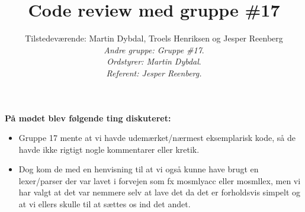 \documentclass[a4paper,10pt,draft]{article}
\begin{document}
\title{Code review med gruppe \#17}
\author{Tilstedeværende: Martin Dybdal, Troels Henriksen og Jesper Reenberg\\
\textit{Andre gruppe: Gruppe \#17}.\\
\textit{Ordstyrer: Martin Dybdal}.\\
\textit{Referent: Jesper Reenberg.}}
\maketitle


\textbf{På mødet blev følgende ting diskuteret:}
\\

\begin{itemize}

\item Gruppe 17 mente at vi havde udemærket/nærmest eksemplarisk kode, så de havde ikke rigtigt nogle kommentarer eller kretik.

\item Dog kom de med en henvisning til at vi også kunne have brugt en lexer/parser der var lavet i forvejen som fx mosmlyacc eller mosmllex, men vi har valgt at det var nemmere selv at lave det da det er forholdsvis simpelt og at vi ellers skulle til at sættes os ind  det andet.

\end{itemize}
\end{document}
